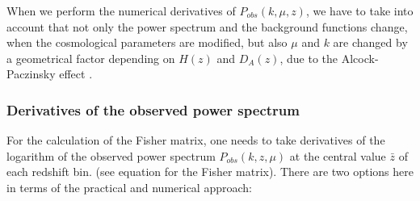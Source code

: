 When we perform the numerical derivatives
of $P_{obs}(k,\mu,z)$, we have to take into account that not only
the power spectrum and the background functions change, when the cosmological
parameters are modified, but also $\mu$ and $k$ are changed by a
geometrical factor depending on $H(z)$ and $D_{A}(z)$, due to the
Alcock-Paczinsky effect \citep{alcock1979anevolution}.

\subsubsection{Derivatives of the observed power spectrum}

For the calculation of the Fisher matrix, one needs to take derivatives
of the logarithm of the observed power spectrum $P_{obs}(k,z,\mu)$
at the central value $\bar{z}$ of each redshift bin. (see equation
for the Fisher matrix). There are two options here in terms of the
practical and numerical approach: 
